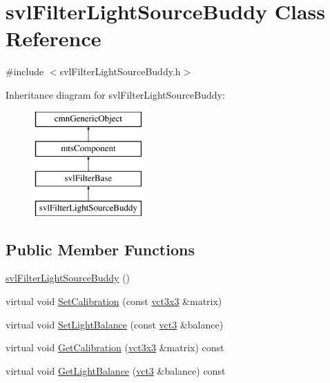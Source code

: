 \hypertarget{classsvl_filter_light_source_buddy}{\section{svl\-Filter\-Light\-Source\-Buddy Class Reference}
\label{classsvl_filter_light_source_buddy}
}


{\ttfamily \#include $<$svl\-Filter\-Light\-Source\-Buddy.\-h$>$}

Inheritance diagram for svl\-Filter\-Light\-Source\-Buddy\-:\begin{figure}[H]
\begin{center}
\leavevmode
\includegraphics[height=4.000000cm]{db/d93/classsvl_filter_light_source_buddy}
\end{center}
\end{figure}
\subsection*{Public Member Functions}
\begin{DoxyCompactItemize}
\item 
\hyperlink{classsvl_filter_light_source_buddy_a3d9c37c1ac817a4bdb8e3730367b8a7e}{svl\-Filter\-Light\-Source\-Buddy} ()
\item 
virtual void \hyperlink{classsvl_filter_light_source_buddy_a48c257c05859aebea52b30257179430a}{Set\-Calibration} (const \hyperlink{vct_fixed_size_matrix_types_8h_aac4a419dacf9282410675d42ebc86a7c}{vct3x3} \&matrix)
\item 
virtual void \hyperlink{classsvl_filter_light_source_buddy_a95dc47d1ca817264469f0cbfe8a808fc}{Set\-Light\-Balance} (const \hyperlink{vct_fixed_size_vector_types_8h_a3af82acdbf4eeb73c551909240b106ea}{vct3} \&balance)
\item 
virtual void \hyperlink{classsvl_filter_light_source_buddy_a692de87991bb2ba0c9c227d65775e1f2}{Get\-Calibration} (\hyperlink{vct_fixed_size_matrix_types_8h_aac4a419dacf9282410675d42ebc86a7c}{vct3x3} \&matrix) const 
\item 
virtual void \hyperlink{classsvl_filter_light_source_buddy_a9db6ec607790cf43891d33919459f926}{Get\-Light\-Balance} (\hyperlink{vct_fixed_size_vector_types_8h_a3af82acdbf4eeb73c551909240b106ea}{vct3} \&balance) const 
\end{DoxyCompactItemize}
